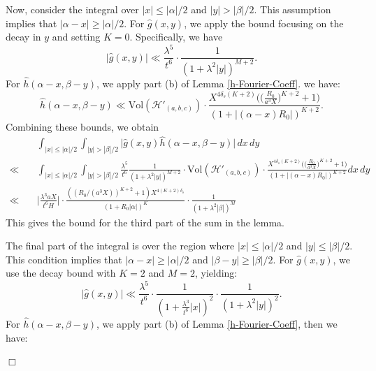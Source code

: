 \documentclass{article}
\def\H{{\mathcal H}}
\def\H{{\mathcal H}}
\newenvironment{proof}{\noindent {\bf Proof:}}{$\Box$ \vspace{2 ex}}
\begin{document}
\begin{proof}
Now, consider the integral over $|x| \leq |\alpha|/2$ and $|y| > |\beta|/2$. This assumption implies that $|\alpha - x| \geq |\alpha|/2$. For $\widehat{g}(x, y)$, we apply the bound focusing on the decay in $y$ and setting $K = 0$. Specifically, we have
\begin{equation*}
\big|\widehat{g}(x, y)\big| \ll \frac{\lambda^5}{t^6} \cdot \frac{1}{(1 + \lambda^2 |y|)^{M+2}}.
\end{equation*}
For $\widehat{h}(\alpha - x, \beta - y)$, we apply part (b) of Lemma \ref{h-Fourier-Coeff}. we have:
\begin{equation*}
\widehat{h}(\alpha - x, \beta - y) \ll \text{Vol}(\H'_{(a,b,c)}) \cdot \frac{X^{4 \delta_s (K+2) }\Big(\big(\frac{R_0}{a^3 X}\big)^{K+2} + 1\Big)}{(1 + |(\alpha - x) R_0|)^{K+2}}.
\end{equation*}
Combining these bounds, we obtain
\begin{align*}
&\int_{|x| \leq |\alpha|/2} \int_{|y| > |\beta|/2} \big|\widehat{g}(x, y) \widehat{h}(\alpha - x, \beta - y)\big| \, dx \, dy \\ \ll \quad
&\int_{|x| \leq |\alpha|/2} \int_{|y| > |\beta|/2}   \frac{\lambda^5}{t^6} \frac{1}{(1 + \lambda^2 |y|)^{M+2}} \cdot \text{Vol}(\H'_{(a,b,c)}) \cdot \frac{X^{4 \delta_s (K+2) }\Big(\big(\frac{R_0}{a^3 X}\big)^{K+2} + 1\Big)}{(1 + |(\alpha - x) R_0|)^{K+2}}  dx \, dy \\ \ll \quad
&\big|\frac{\lambda^{3}aX}{t^6H}\big| \cdot\frac{((R_0/(a^3X))^{K+2}+1) X^{4(K+2)\delta_s}}{(1+R_0|\alpha|)^K} \cdot\frac{1}{(1+ \lambda^2|\beta|)^M}
\end{align*}
This gives the bound for the third part of the sum in the lemma.

The final part of the integral is over the region where $|x| \leq |\alpha|/2$ and $|y| \leq |\beta|/2$. This condition implies that $|\alpha - x| \geq |\alpha|/2$ and $|\beta - y| \geq |\beta|/2$. For $\widehat{g}(x, y)$, we use the decay bound with $K = 2$ and $M = 2$, yielding:
\begin{equation*}
\big|\widehat{g}(x, y)\big| \ll \frac{\lambda^5}{t^6} \cdot \frac{1}{\left(1 + \frac{\lambda^3}{t^6} |x|\right)^{2}} \cdot \frac{1}{(1 + \lambda^2 |y|)^{2}}.
\end{equation*}
For $\widehat{h}(\alpha - x, \beta - y)$, we apply part (b) of Lemma \ref{h-Fourier-Coeff}, then we have:


\end{proof}
\end{document}
